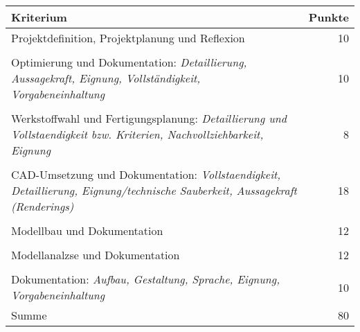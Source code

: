 \documentclass{report}
\begin{document}
\begin{table}[htbp]
  \centering
  \begin{tabular}{@{}p{8cm}r@{}}
    \toprule
    \textbf{Kriterium} & \textbf{Punkte} \\
    \midrule
    Projektdefinition, Projektplanung und Reflexion & 10 \\
    \vspace{1pt} & \vspace{1pt} \\
    Optimierung und Dokumentation: \textit{Detaillierung, Aussagekraft,
  Eignung, Vollständigkeit, Vorgabeneinhaltung} & 10 \\
    \vspace{1pt} & \vspace{1pt} \\
    Werkstoffwahl und Fertigungsplanung: \textit{Detaillierung und
  Vollstaendigkeit bzw. Kriterien, Nachvollziehbarkeit, Eignung} & 8 \\
    \vspace{1pt} & \vspace{1pt} \\
    CAD-Umsetzung und Dokumentation: \textit{Vollstaendigkeit, Detaillierung,
  Eignung/technische Sauberkeit, Aussagekraft (Renderings)} & 18 \\
    \vspace{1pt} & \vspace{1pt} \\
     Modellbau und Dokumentation & 12 \\
    \vspace{1pt} & \vspace{1pt} \\
    Modellanalzse und Dokumentation & 12 \\
    \vspace{1pt} & \vspace{1pt} \\
    Dokumentation: \textit{Aufbau, Gestaltung, Sprache, Eignung, Vorgabeneinhaltung}& 10 \\
    \midrule
    Summe & 80 \\
    \bottomrule
  \end{tabular}
\end{table}
\end{document}
